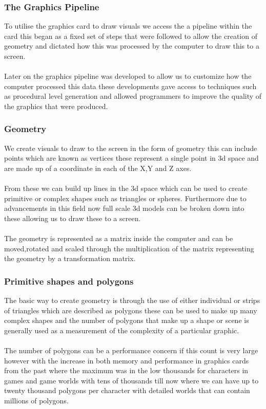 \documentclass[12pt,a4paper]{article}
\begin{document}
\subsubsection{The Graphics Pipeline}
To utilise the graphics card to draw visuals we access the a pipeline within the card this began as a fixed set of steps that were followed to allow the creation of geometry and dictated how this was processed by the computer to draw this to a screen.\\\\Later on the graphics pipeline was developed to allow us to customize how the computer processed this data these developments gave access to techniques such as procedural level generation and allowed programmers to improve the quality of the graphics that were produced.   
\subsubsection{Geometry}
We create visuals to draw to the screen in the form of geometry this can include points which are known as vertices these represent a single point in 3d space and are made up of a coordinate in each of the X,Y and Z axes.\\\\From these we can build up lines in the 3d space which can be used to create primitive or complex shapes such as triangles or spheres. Furthermore due to advancements in this field now full scale 3d models can be broken down into these allowing us to draw these to a screen.\\\\ The geometry is represented as a matrix inside the computer and can be moved,rotated and scaled through the multiplication of the matrix representing the geometry by a transformation matrix.

\subsubsection{Primitive shapes and polygons}
The basic way to create geometry is through the use of either individual or strips of triangles which are described as polygons these can be used to make up many complex shapes and the number  of polygons that make up a shape or scene is generally used as a measurement of the complexity of a particular graphic.\\\\The number of polygons can be a performance concern if this count is very large however with the increase in both memory and performance in graphics cards from the past where the maximum was in the low thousands for characters in games and game worlds with tens of thousands till now where we can have up to twenty thousand polygons per character with detailed worlds that can contain millions of polygons.       
\end{document}
